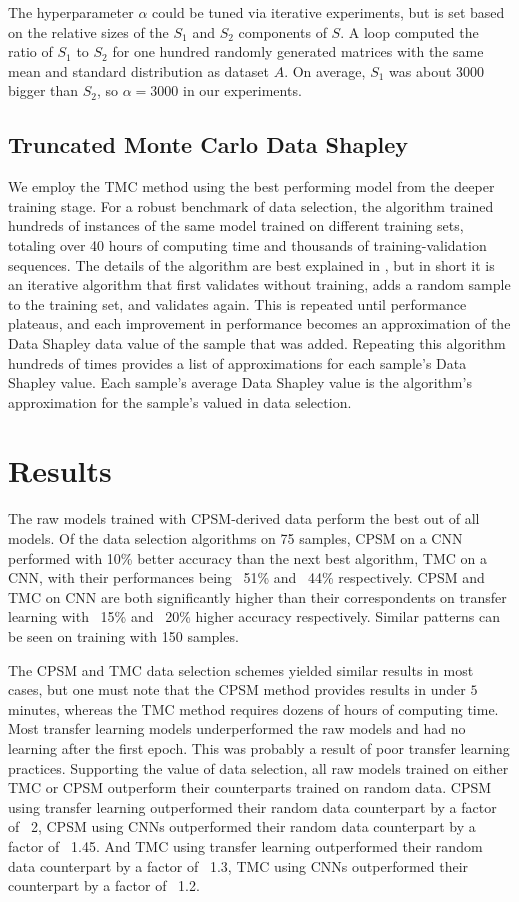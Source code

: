 \documentclass[10pt,twocolumn,letterpaper]{article}
\begin{document}
The hyperparameter $\alpha$ could be tuned via iterative experiments, but is set based on the relative sizes of the $S_1$ and $S_2$ components of $S$. A loop computed the ratio of $S_1$ to $S_2$ for one hundred randomly generated matrices with the same mean and standard distribution as dataset $A$. On average, $S_1$ was about $3000$  bigger than $S_2$, so $\alpha = 3000$ in our experiments.

\subsection{Truncated Monte Carlo Data Shapley}

We employ the TMC method using the best performing model from the deeper training stage. For a robust benchmark of data selection, the algorithm trained hundreds of instances of the same model trained on different training sets, totaling over 40 hours of computing time and thousands of training-validation sequences. The details of the algorithm are best explained in \cite{datashapley}, but in short it is an iterative algorithm that first validates without training, adds a random sample to the training set, and validates again. This is repeated until performance plateaus, and each improvement in performance becomes an approximation of the Data Shapley data value of the sample that was added. Repeating this algorithm hundreds of times provides a list of approximations for each sample's Data Shapley value. Each sample's average Data Shapley value is the algorithm's approximation for the sample's valued in data selection.



\section{Results}



The raw models trained with CPSM-derived data perform the best out of all models. Of the data selection algorithms on 75 samples, CPSM on a CNN performed with 10\% better accuracy than the next best algorithm, TMC on a CNN, with their performances being ~51\% and ~44\% respectively. CPSM and TMC on CNN are both significantly higher than their correspondents on transfer learning with ~15\% and ~20\% higher accuracy respectively. Similar patterns can be seen on training with 150 samples.

The CPSM and TMC data selection schemes yielded similar results in most cases, but one must note that the CPSM method provides results in under $5$ minutes, whereas the TMC method requires dozens of hours of computing time. Most transfer learning models underperformed the raw models and had no learning after the first epoch. This was probably a result of poor transfer learning practices. Supporting the value of data selection, all raw models trained on either TMC or CPSM outperform their counterparts trained on random data. CPSM using transfer learning outperformed their random data counterpart by a factor of ~2, CPSM using CNNs outperformed their random data counterpart by a factor of ~1.45. And TMC using transfer learning outperformed their random data counterpart by a factor of ~1.3, TMC using CNNs outperformed their counterpart by a factor of ~1.2.
\end{document}
